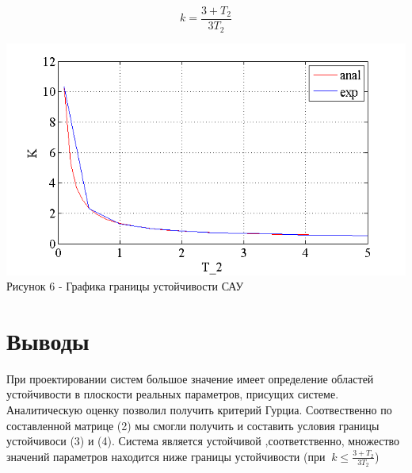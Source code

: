 \documentclass[a4paper, 12pt]{article}
\begin{document}
\begin{equation}
k =\frac{3 + T_2}{3T_2}
\end{equation}

\begin{center}
		\includegraphics[width=0.7\linewidth]{4}
		\\
	\centering  Рисунок 6 - Графика границы устойчивости САУ

	
\end{center}

\newpage

	\section*{\centering Выводы}

При проектировании систем большое значение имеет определение областей устойчивости в плоскости реальных параметров, присущих системе. Аналитическую оценку позволил получить критерий Гурциа. Соотвественно по составленной матрице (2) мы смогли получить и составить условия границы устойчивоси (3) и (4). Система является устойчивой ,соответственно, множество значений параметров находится ниже границы устойчивости (при %
$\ k \le \frac{{3 + {T_2}}}{{3{T_2}}}$)
\end{document}
